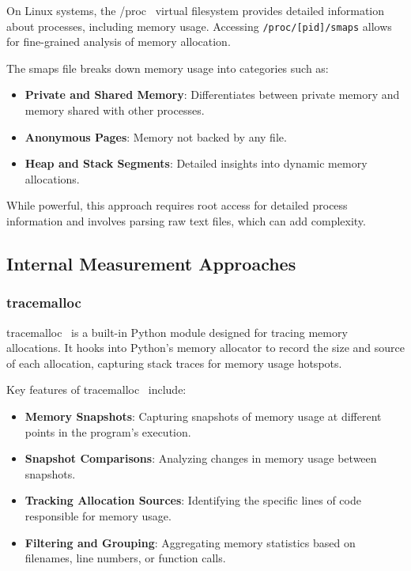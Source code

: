 On Linux systems, the /proc~\cite{procfs} virtual filesystem provides detailed information about processes, including memory usage.
Accessing \texttt{/proc/[pid]/smaps} allows for fine-grained analysis of memory allocation.

The smaps file breaks down memory usage into categories such as:

\begin{itemize}
    \item \textbf{Private and Shared Memory}:
    Differentiates between private memory and memory shared with other processes.

    \item \textbf{Anonymous Pages}:
    Memory not backed by any file.

    \item \textbf{Heap and Stack Segments}:
    Detailed insights into dynamic memory allocations.
\end{itemize}

While powerful, this approach requires root access for detailed process information and involves parsing raw text files, which can add complexity.

\subsection{Internal Measurement Approaches}
\label{subsec:mmc-internal-measurement-approaches}

\subsubsection{tracemalloc}

tracemalloc~\cite{tracemalloc} is a built-in Python module designed for tracing memory allocations.
It hooks into Python's memory allocator to record the size and source of each allocation, capturing stack traces for memory usage hotspots.

Key features of tracemalloc~\cite{tracemalloc} include:

\begin{itemize}
    \item \textbf{Memory Snapshots}:
    Capturing snapshots of memory usage at different points in the program's execution.

    \item \textbf{Snapshot Comparisons}:
    Analyzing changes in memory usage between snapshots.

    \item \textbf{Tracking Allocation Sources}:
    Identifying the specific lines of code responsible for memory usage.

    \item \textbf{Filtering and Grouping}:
    Aggregating memory statistics based on filenames, line numbers, or function calls.
\end{itemize}

